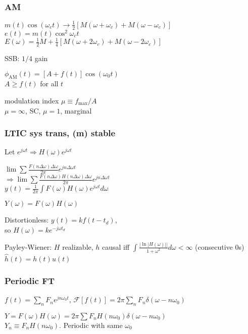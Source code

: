 \documentclass[4pt]{article}
\theoremstyle{definition}
\theoremstyle{definition}
\renewcommand{\o}{\omega}
\newcommand{\ra}{\rightarrow}
\begin{document}
\begin{multicols}{3}
\subsubsection{AM}
    \(m(t) \cos(\o_c t) \ra \frac{1}{2}[M(\o + \o_c) + M(\o - \o_c)]\)\\     %
    \(e(t) = m(t)\cos^2 \o_c t\)  \\          %
    \(E(\o) = \frac{1}{2} M + \frac{1}{4}[M(\o + 2\o_c) + M(\o - 2\o_c)]\)

    SSB: $1/4$ gain

    \(\phi_\mathrm{AM} (t) = [A + f(t)] \cos (\omega_0 t)\)\\
    $A \geq f(t)$ for all $t$

    modulation index \(\mu\equiv f_{\text{max}}/A\)\\
    $\mu = \infty$, SC, $\mu = 1$, marginal
\subsubsection{LTIC sys trans, (m) stable}
    Let \(e^{j\o t} \Rightarrow H(\o) e^{j\o t}\)

    \(\lim\sum \frac{F(n\Delta\o)\Delta\o}{2\pi} e^{jn\Delta\o t}\)\\
    \(\Rightarrow \lim\sum \frac{F(n\Delta\o)H(n\Delta\o)\Delta\o}{2\pi} e^{jn\Delta\o t}\)\\
    \(y(t) = \frac{1}{2\pi}\int F(\o)H(\o)e^{j\o t} d\o\)

    \(Y(\o) = F(\o) H(\o)\)

    Distortionless: $y(t) = kf(t-t_d)$,\\
    so $H(\o) = ke^{-j\o t_d}$          %

    Payley-Wiener: $H$ realizable, $h$ causal iff \(\int\frac{|\ln|H(\omega)||}{1+\o^2} d\o < \infty\) (consecutive 0s)\\
    \(\hat{h}(t) = h(t) u(t)\)

\subsubsection{Periodic FT}
    \(f(t) = \sum_n F_n e^{jn\o_0 t}\), \(\mathcal{F}[f(t)] = 2\pi \sum_n F_n \delta(\omega - n\o_0)\)      %

    \(Y = F(\omega)H(\omega) = 2\pi \sum F_n H(n\omega_0) \delta(\omega - n\omega_0) \) \\            %
    $Y_n \equiv F_n H(n\o_0)$. Periodic with same $\omega_0$


\end{multicols}
\end{document}
